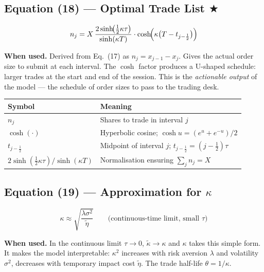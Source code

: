 \documentclass[11pt,a4paper]{article}
\begin{document}
\subsection*{Equation (18) — Optimal Trade List \texorpdfstring{$\bigstar$}{}}

\begin{equation}
  n_j = X\,\frac{2\sinh\!\bigl(\tfrac{1}{2}\kappa\tau\bigr)}{\sinh(\kappa T)}
        \cdot \cosh\!\Bigl(\kappa\bigl(T - t_{j-\frac{1}{2}}\bigr)\Bigr)
\end{equation}

\textbf{When used.} Derived from Eq.~(17) as $n_j = x_{j-1} - x_j$.  Gives the actual
order size to submit at each interval.  The $\cosh$ factor produces a U-shaped schedule:
larger trades at the start and end of the session.  This is the \emph{actionable output}
of the model — the schedule of order sizes to pass to the trading desk.

\begin{center}
\begin{tabular}{@{}L{3.5cm}L{10cm}@{}}
\toprule
\textbf{Symbol} & \textbf{Meaning} \\
\midrule
$n_j$ & Shares to trade in interval $j$ \\
$\cosh(\cdot)$ & Hyperbolic cosine; $\cosh u = (e^u + e^{-u})/2$ \\
$t_{j-\frac{1}{2}}$ & Midpoint of interval $j$; $t_{j-\frac{1}{2}} = (j-\tfrac{1}{2})\tau$ \\
$2\sinh(\tfrac{1}{2}\kappa\tau)/\sinh(\kappa T)$ & Normalisation ensuring $\sum_j n_j = X$ \\
\bottomrule
\end{tabular}
\end{center}

\subsection*{Equation (19) — Approximation for $\kappa$}

\begin{equation}
  \kappa \approx \sqrt{\frac{\lambda\sigma^2}{\tilde{\eta}}}
  \qquad\text{(continuous-time limit, small $\tau$)}
\end{equation}

\textbf{When used.} In the continuous limit $\tau\to 0$, $\tilde{\kappa}\to\kappa$ and
$\kappa$ takes this simple form.  It makes the model interpretable: $\kappa^2$ increases
with risk aversion $\lambda$ and volatility $\sigma^2$, decreases with temporary impact
cost $\tilde{\eta}$.  The trade half-life $\theta = 1/\kappa$.
\end{document}
